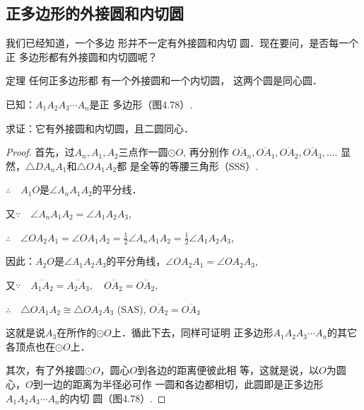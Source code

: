 \subsection{正多边形的外接圆和内切圆}
我们已经知道，一个多边
形并不一定有外接圆和内切
圆．现在要问，是否每一个正
多边形都有外接圆和内切圆呢？

\begin{blk}
  {定理} 任何正多边形都
有一个外接圆和一个内切圆，
这两个圆是同心圆．
\end{blk}

已知：$A_1A_2A_3\cdots A_n$是正
多边形（图4.78）.

求证：它有外接圆和内切圆，且二圆同心．

\begin{figure}[htp]
  \centering
  \caption{}
\end{figure}


\begin{proof}
首先，过$A_n,A_1,A_2$三点作一圆$\odot O$, 再分别作
$\overline{OA_n},\overline{OA_1},\overline{OA_2},\overline{OA_3},\ldots$. 显然，$\triangle DA_nA_1$和$\triangle OA_1A_2$都
是全等的等腰三角形（SSS）.

$\therefore\quad A_1O$是$\angle A_nA_1A_2$的平分线．

又$\because\quad \angle A_nA_1A_2=\angle A_1A_2A_3$,

$\therefore\quad \angle OA_2A_1=\angle OA_1A_2=\frac{1}{2}\angle A_nA_1A_2=\frac{1}{2}\angle A_1A_2A_3$,

因此：$A_2O$是$\angle A_1A_2A_3$的平分角线，$\angle OA_2A_1=\angle OA_2A_3$,

又$\because\quad \overline{A_1A_2}=\overline{A_2A_3},\quad \overline{OA_2}=\overline{OA_2}$,

$\therefore\quad \triangle OA_1A_2\cong \triangle OA_2A_3$ (SAS), $\overline{OA_2}=\overline{OA_3}$

这就是说$A_3$在所作的$\odot O$上．循此下去，同样可证明
正多边形$A_1A_2A_3\cdots A_n$的其它各顶点也在$\odot O$上．

其次，有了外接圆$\odot O$，圆心$O$到各边的距离便彼此相
等，这就是说，以$O$为圆心，$O$到一边的距离为半径必可作
一圆和各边都相切，此圆即是正多边形$A_1A_2A_3\cdots A_n$的内切
圆（图4.78）.
\end{proof}


